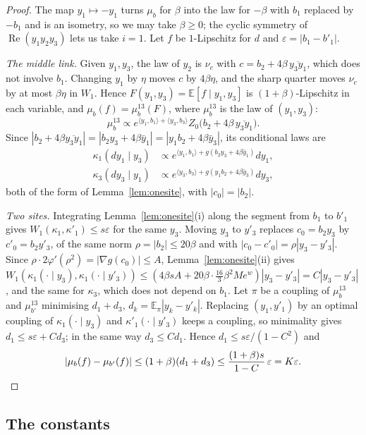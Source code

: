 \documentclass[11pt]{amsart}
\theoremstyle{definition}
\theoremstyle{remark}
\numberwithin{equation}{section}
\newcommand{\E}{\mathbb{E}}
\newcommand{\ip}[2]{\langle #1,#2\rangle}
\begin{document}
\begin{proof}
The map $y_1\mapsto-y_1$ turns $\mu_b$ for $\beta$ into the law for $-\beta$
with $b_1$ replaced by $-b_1$ and is an isometry, so we may take $\beta\ge0$;
the cyclic symmetry of $\operatorname{Re}(y_1y_2y_3)$ lets us take $i=1$. Let
$f$ be $1$-Lipschitz for $d$ and $\varepsilon=|b_1-b'_1|$.

\emph{The middle link.} Given $y_1,y_3$, the law of $y_2$ is $\nu_c$ with $c=
b_2+4\beta\,\overline{y_3y_1}$, which does not involve $b_1$. Changing $y_1$
by $\eta$ moves $c$ by $4\beta\eta$, and the sharp quarter moves $\nu_c$ by at
most $\beta\eta$ in $W_1$. Hence $F(y_1,y_3)=\E[f\mid y_1,y_3]$ is
$(1+\beta)$-Lipschitz in each variable, and $\mu_b(f)=\mu^{13}_b(F)$, where
$\mu^{13}_b$ is the law of $(y_1,y_3)$:
\[
\mu^{13}_b\propto e^{\ip{y_1}{b_1}+\ip{y_3}{b_3}}Z_0\bigl(b_2+4\beta\,
\overline{y_3y_1}\bigr).
\]
Since $|b_2+4\beta\overline{y_3y_1}|=|b_2y_3+4\beta\bar y_1|=|y_1b_2+
4\beta\bar y_3|$, its conditional laws are
\[
\begin{split}
\kappa_1(dy_1\mid y_3)&\propto e^{\ip{y_1}{b_1}+g(b_2y_3+4\beta\bar y_1)}dy_1,\\
\kappa_3(dy_3\mid y_1)&\propto e^{\ip{y_3}{b_3}+g(y_1b_2+4\beta\bar y_3)}dy_3,
\end{split}
\]
both of the form of Lemma~\ref{lem:onesite}, with $|c_0|=|b_2|$.

\emph{Two sites.} Integrating Lemma~\ref{lem:onesite}(i) along the segment
from $b_1$ to $b'_1$ gives $W_1(\kappa_1,\kappa'_1)\le s\varepsilon$ for the
same $y_3$. Moving $y_3$ to $y'_3$ replaces $c_0=b_2y_3$ by $c'_0=b_2y'_3$,
of the same norm $\rho=|b_2|\le20\beta$ and with $|c_0-c'_0|=\rho|y_3-y'_3|$.
Since $\rho\cdot2\varphi'(\rho^2)=|\nabla g(c_0)|\le A$,
Lemma~\ref{lem:onesite}(ii) gives $W_1(\kappa_1(\cdot\mid y_3),\kappa_1(
\cdot\mid y'_3))\le(4\beta sA+20\beta\cdot\frac{16}3\beta^2Me^w)|y_3-y'_3|=
C|y_3-y'_3|$, and the same for $\kappa_3$, which does not depend on $b_1$. Let $\pi$ be a coupling of $\mu^{13}_b$ and $\mu^{13}_{b'}$
minimising $d_1+d_3$, $d_k=\E_\pi|y_k-y'_k|$. Replacing $(y_1,y'_1)$ by an
optimal coupling of $\kappa_1(\cdot\mid y_3)$ and $\kappa'_1(\cdot\mid y'_3)$
keeps a coupling, so minimality gives $d_1\le s\varepsilon+Cd_3$; in the
same way $d_3\le Cd_1$. Hence $d_1\le s\varepsilon/(1-C^2)$ and
\[
|\mu_b(f)-\mu_{b'}(f)|\le(1+\beta)(d_1+d_3)\le\frac{(1+\beta)s}{1-C}
\,\varepsilon=K\varepsilon .\qedhere
\]
\end{proof}

\subsection{The constants}
\end{document}
